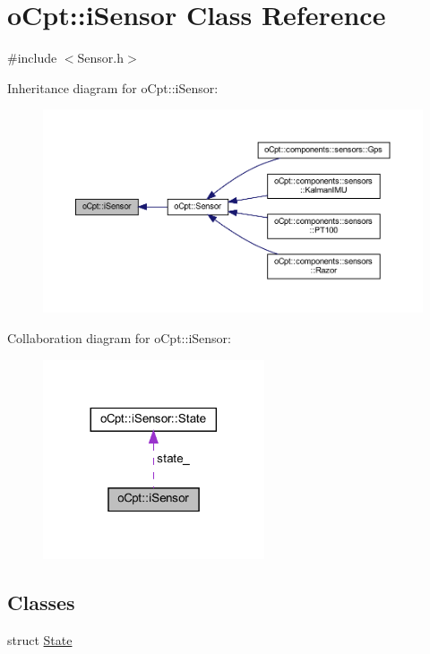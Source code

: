 \hypertarget{classo_cpt_1_1i_sensor}{}\section{o\+Cpt\+:\+:i\+Sensor Class Reference}
\label{classo_cpt_1_1i_sensor}


{\ttfamily \#include $<$Sensor.\+h$>$}



Inheritance diagram for o\+Cpt\+:\+:i\+Sensor\+:
\nopagebreak
\begin{figure}[H]
\begin{center}
\leavevmode
\includegraphics[width=350pt]{classo_cpt_1_1i_sensor__inherit__graph}
\end{center}
\end{figure}


Collaboration diagram for o\+Cpt\+:\+:i\+Sensor\+:
\nopagebreak
\begin{figure}[H]
\begin{center}
\leavevmode
\includegraphics[width=185pt]{classo_cpt_1_1i_sensor__coll__graph}
\end{center}
\end{figure}
\subsection*{Classes}
\begin{DoxyCompactItemize}
\item 
struct \hyperlink{structo_cpt_1_1i_sensor_1_1_state}{State}
\end{DoxyCompactItemize}
